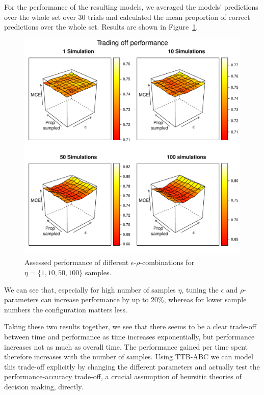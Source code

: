 \documentclass[a4paper,man, natbib]{apa6}
\begin{document}
For the performance of the resulting models, we averaged the models' predictions over the whole set over 30 trials and calculated the mean proportion of correct predictions over the whole set. Results are shown in Figure~\ref{fig:performancetradeoff}.
\begin{figure}[htb!]
  \caption{Assessed performance of different $\epsilon$-$\rho$-combinations for $\eta=\{1,10,50,100\}$ samples.}
\label{fig:performancetradeoff}
  \centering
    \includegraphics[scale=0.6]{figs/performancetradeoff.pdf}
\end{figure}

We can see that, especially for high number of samples $\eta$, tuning the $\epsilon$ and $\rho$-parameters can increase performance by up to 20\%, whereas for lower sample numbers the configuration matters less.

Taking these two results together, we see that there seems to be a clear trade-off between time and performance as time increases exponentially, but performance increases not as much as overall time. The performance gained per time spent therefore increases with the number of samples. Using TTB-ABC we can model this trade-off explicitly by changing the different parameters and actually test the performance-accuracy trade-off, a crucial assumption of heursitic theories of decision making, directly.
\end{document}

